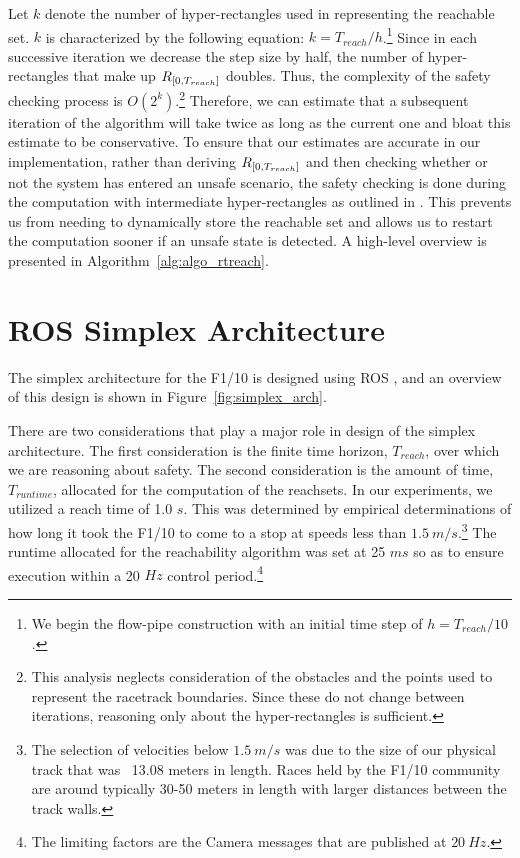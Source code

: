 \documentclass[manuscript,screen,review]{acmart}
\newcommand{\todo}[1]{\textcolor{red}{\textbf{\underline{TODO:}} #1}}
\newcommand{\figref}[1]{Figure~\ref{#1}}
\begin{document}
Let $k$ denote the number of hyper-rectangles used in representing the reachable set. $k$ is characterized by the following equation: $k = T_{reach} / h$.\footnote{We begin the flow-pipe construction with an initial time step of $h = T_{reach}/10$.} Since in each successive iteration we decrease the step size by half, the number of hyper-rectangles that make up $\mathnormal{R}_{[0,T_{reach}]}$ doubles. Thus, the complexity of the safety checking process is $O(2^k)$.\footnote{This analysis neglects consideration of the obstacles and the points used to represent the racetrack boundaries. Since these do not change between iterations, reasoning only about the hyper-rectangles is sufficient.} Therefore, we can estimate that a subsequent iteration of the algorithm will take twice as long as the current one and bloat this estimate to be conservative. To ensure that our estimates are accurate in our implementation, rather than deriving $\mathnormal{R}_{[0,T_{reach}]}$ and then checking whether or not the system has entered an unsafe scenario, the safety checking is done during the computation with intermediate hyper-rectangles as outlined in \cite{Bak2014}. This prevents us from needing to dynamically store the reachable set and allows us to restart the computation sooner if an unsafe state is detected. A high-level overview is presented in Algorithm~\ref{alg:algo_rtreach}.%







\section{ROS Simplex Architecture}

\label{section:simplex}
The simplex architecture for the F1/10 is designed using ROS \cite{ROS}, and an overview of this design is shown in \figref{fig:simplex_arch}. 

There are two considerations that play a major role in design of the simplex architecture. The first consideration is the finite time horizon, $T_{reach}$, over which we are reasoning about safety. The second consideration is the amount of time, $T_{runtime}$, allocated for the computation of the reachsets. In our experiments, we utilized a reach time of 1.0 $s$. This was determined by empirical determinations of how long it took the F1/10 to come to a stop at speeds less than $1.5 \ m/s.$\footnote{The selection of velocities below $1.5 \ m/s$ was due to the size of our physical track that was ~13.08 meters in length. Races held by the F1/10 community are around typically 30-50 meters in length with larger distances between the track walls.} The runtime allocated for the reachability algorithm was set at 25 $ms$ so as to ensure execution within a 20 $Hz$ control period.\footnote{The limiting factors are the Camera messages that are published at $20 \ Hz$.}  
\end{document}
